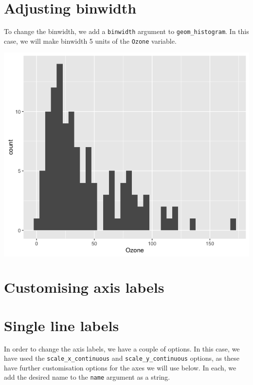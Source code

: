 \section{Adjusting binwidth}\label{adjusting-binwidth}

To change the binwidth, we add a \texttt{binwidth} argument to
\texttt{geom\_histogram}. In this case, we will make binwidth 5 units of
the \texttt{Ozone} variable.

\begin{Shaded}
\begin{Highlighting}[]
\StringTok{ }\NormalTok{(} \StringTok{ }
\StringTok{      }\NormalTok{(}\NormalTok{(}  \NormalTok{)}
\end{Highlighting}
\end{Shaded}

\begin{center}\includegraphics[width=0.55\linewidth]{0_all_posts_pdf/histogram_4-1} \end{center}

\section{Customising axis labels}\label{customising-axis-labels}

\section*{Single line labels}\label{single-line-labels}

In order to change the axis labels, we have a couple of options. In this
case, we have used the \texttt{scale\_x\_continuous} and
\texttt{scale\_y\_continuous} options, as these have further
customisation options for the axes we will use below. In each, we add
the desired name to the \texttt{name} argument as a string.

